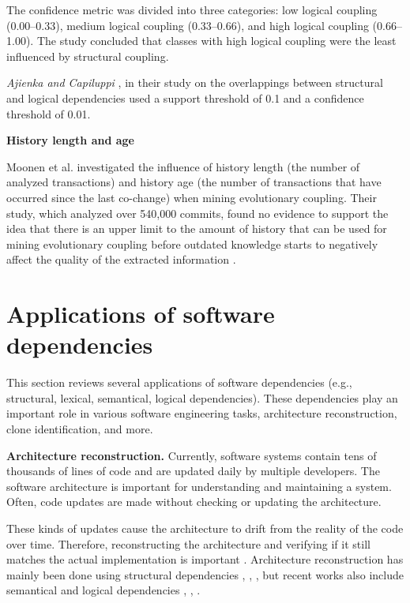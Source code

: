The confidence metric was divided into three categories: low logical coupling (0.00–0.33), medium logical coupling (0.33–0.66), and high logical coupling (0.66–1.00). The study concluded that classes with high logical coupling were the least influenced by structural coupling.

\textit{Ajienka and Capiluppi} \cite{DBLP:journals/ese/AjienkaCC18}, in their study on the overlappings between structural and logical dependencies used a support threshold of 0.1 and a confidence threshold of 0.01.



\textbf{History length and age}

Moonen et al. investigated the influence of history length (the number of analyzed transactions) and history age (the number of transactions that have occurred since the last co-change) when mining evolutionary coupling. Their study, which analyzed over 540,000 commits, found no evidence to support the idea that there is an upper limit to the amount of history that can be used for mining evolutionary coupling before outdated knowledge starts to negatively affect the quality of the extracted information \cite{article-Moonen}.


\section{Applications of software dependencies}
\label{app}

\hspace{4em}This section reviews several applications of software dependencies (e.g., structural, lexical, semantical, logical dependencies). These dependencies play an important role in various software engineering tasks, architecture reconstruction, clone identification, and more. 


\textbf{Architecture reconstruction.}
Currently, software systems contain tens of thousands of lines of code and are updated daily by multiple developers. The software architecture is important for understanding and maintaining a system. Often, code updates are made without checking or updating the architecture.

These kinds of updates cause the architecture to drift from the reality of the code over time. Therefore, reconstructing the architecture and verifying if it still matches the actual implementation is important \cite{RecoverySartipi, model-bennett, Kalliamvakou2016}. Architecture reconstruction has mainly been done using structural dependencies \cite{sar}, \cite{PagerankENASE}, \cite{Bass-archreconstruction}, but recent works also include semantical and logical dependencies \cite{lexical-dep}, \cite{corazza2}, \cite{maletic}.

